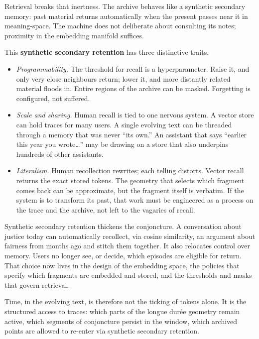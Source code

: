 \documentclass[12pt,a4paper]{article}
\begin{document}
Retrieval breaks that inertness. The archive behaves like a synthetic secondary memory: past material returns automatically when the present passes near it in meaning-space. The machine does not deliberate about consulting its notes; proximity in the embedding manifold suffices.

This \textbf{synthetic secondary retention} has three distinctive traits.

\begin{itemize}
  \item \emph{Programmability.} The threshold for recall is a hyperparameter. Raise it, and only very close neighbours return; lower it, and more distantly related material floods in. Entire regions of the archive can be masked. Forgetting is configured, not suffered.

  \item \emph{Scale and sharing.} Human recall is tied to one nervous system. A vector store can hold traces for many users. A single evolving text can be threaded through a memory that was never ``its own.'' An assistant that says ``earlier this year you wrote\ldots'' may be drawing on a store that also underpins hundreds of other assistants.

  \item \emph{Literalism.} Human recollection rewrites; each telling distorts. Vector recall returns the exact stored tokens. The geometry that selects which fragment comes back can be approximate, but the fragment itself is verbatim. If the system is to transform its past, that work must be engineered as a process on the trace and the archive, not left to the vagaries of recall.
\end{itemize}

Synthetic secondary retention thickens the conjoncture. A conversation about justice today can automatically recollect, via cosine similarity, an argument about fairness from months ago and stitch them together. It also relocates control over memory. Users no longer see, or decide, which episodes are eligible for return. That choice now lives in the design of the embedding space, the policies that specify which fragments are embedded and stored, and the thresholds and masks that govern retrieval.

Time, in the evolving text, is therefore not the ticking of tokens alone. It is the structured access to traces: which parts of the longue dur\'ee geometry remain active, which segments of conjoncture persist in the window, which archived points are allowed to re-enter via synthetic secondary retention.
\end{document}
